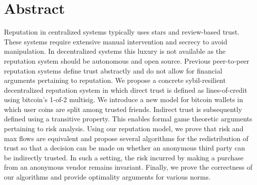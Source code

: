 \section{Abstract}

Reputation in centralized systems typically uses stars and review-based
trust. These systems require extensive manual intervention and secrecy to
avoid manipulation. In decentralized systems this luxury is not available
as the reputation system should be autonomous and open source. Previous
peer-to-peer reputation systems define trust abstractly and do not allow for
financial arguments pertaining to reputation. We propose a concrete
sybil-resilient decentralized reputation system in which direct trust is
defined as lines-of-credit using bitcoin's 1-of-2 multisig. We introduce a new
model for bitcoin wallets in which user coins are split among trusted friends.
Indirect trust is subsequently defined using a transitive property. This
enables formal game theoretic arguments pertaining to risk analysis. Using our
reputation model, we prove that risk and max flows are equivalent and propose
several algorithms for the redistribution of trust so that a decision can be
made on whether an anonymous third party can be indirectly trusted. In such a
setting, the risk incurred by making a purchase from an anonymous vendor
remains invariant. Finally, we prove the correctness of our algorithms and
provide optimality arguments for various norms.
